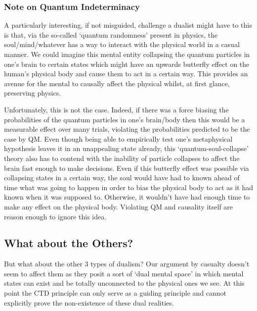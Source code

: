 \documentclass[11pt]{diazessay} %
\begin{document}
	\subsubsection{Note on Quantum Indeterminacy}
		A particularly interesting, if not misguided, challenge a dualist might have to this is that, via the so-called `quantum randomness' present in physics, the soul/mind/whatever has a way to interact with the physical world in a casual manner. We could imagine this mental entity collapsing the quantum particles in one's brain to certain states which might have an upwards butterfly effect on the human's physical body and cause them to act in a certain way. This provides an avenue for the mental to causally affect the physical whilst, at first glance, preserving physics.
		
		Unfortunately, this is not the case. Indeed, if there was a force biasing the probabilities of the quantum particles in one's brain/body then this would be a measurable effect over many trials, violating the probabilities predicted to be the case by QM. Even though being able to empirically test one's metaphysical hypothesis leaves it in an unappealing state already, this `quantum-soul-collapse' theory also has to contend with the inability of particle collapses to affect the brain fast enough to make decisions. Even if this butterfly effect was possible via collapsing states in a certain way, the soul would have had to known ahead of time what was going to happen in order to bias the physical body to act as it had known when it was supposed to. Otherwise, it wouldn't have had enough time to make any effect on the physical body. Violating QM and causality itself are reason enough to ignore this idea.
		

	\subsection{What about the Others?}
		But what about the other 3 types of dualism? Our argument by casualty doesn't seem to affect them as they posit a sort of `dual mental space' in which mental states can exist and be totally unconnected to the physical ones we see. At this point the CTD principle can only serve as a guiding principle and cannot explicitly prove the non-existence of these dual realities.
		
\end{document}
